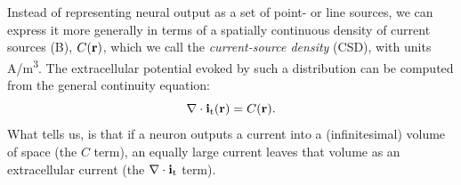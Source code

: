 \section{}
\label{sec:VC:CSD}

Instead of representing neural output as a set of point- or line sources, 
we can express it more generally in terms of a spatially continuous density 
of current sources (B), $C({\bf r})$, 
which we call the \textit{current-source density} (CSD), 
with units \si{A/m^3}. 
The extracellular potential evoked by such a distribution can be computed 
from the general continuity equation:
\begin{equation}
\nabla \cdot {\bf i_\mathrm{t}}({\bf r}) = C({\bf r}).
\label{eq:VC:CSD1}
\end{equation}
What  tells us, is that if a neuron outputs a current into a (infinitesimal) 
volume of space (the $C$ term), an equally large current leaves that volume as an 
extracellular current (the $\nabla \cdot {\bf i}_\mathrm{t}$ term).

